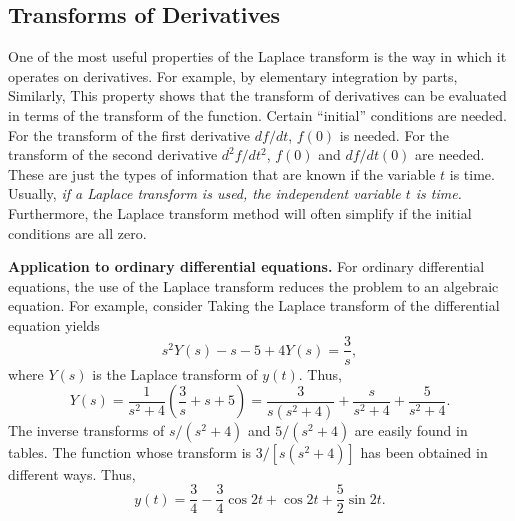 \subsection{Transforms of Derivatives}
\label{sec:13.2.3}

One of the most useful properties of the Laplace transform is the way in which it operates on derivatives.  For example, by elementary integration by parts,
Similarly,
This property shows that the transform of derivatives can be evaluated in terms of the transform of the function.  Certain ``initial'' conditions are needed.  For the transform of the first derivative $df/dt$, $f(0)$ is needed.  For the transform of the second derivative $d^2f/dt^2$, $f(0)$ and $df/dt(0)$ are needed.  These are just the types of information that are known if the variable $t$ is time.  Usually, \emph{if a Laplace transform is used, the independent variable $t$ is time.}  Furthermore, the Laplace transform method will often simplify if the initial conditions are all zero.

\textbf{Application to ordinary differential equations.}
For ordinary differential equations, the use of the Laplace transform reduces the problem to an algebraic equation.  For example, consider
Taking the Laplace transform of the differential equation yields
\[
s^2 Y(s) - s - 5 + 4Y(s) = \frac{3}{s},
\]
where $Y(s)$ is the Laplace transform of $y(t)$.  Thus,
\[
Y(s) = \frac{1}{s^2+4}\left(\frac{3}{s} + s + 5\right)
     = \frac{3}{s(s^2+4)} + \frac{s}{s^2+4} + \frac{5}{s^2+4}.
\]
The inverse transforms of $s/(s^2+4)$ and $5/(s^2+4)$ are easily found in tables.  The function whose transform is $3/[s(s^2+4)]$ has been obtained in different ways.  Thus,
\[
y(t) = \frac{3}{4} - \frac{3}{4}\cos 2t + \cos 2t + \frac{5}{2}\sin 2t.
\]

